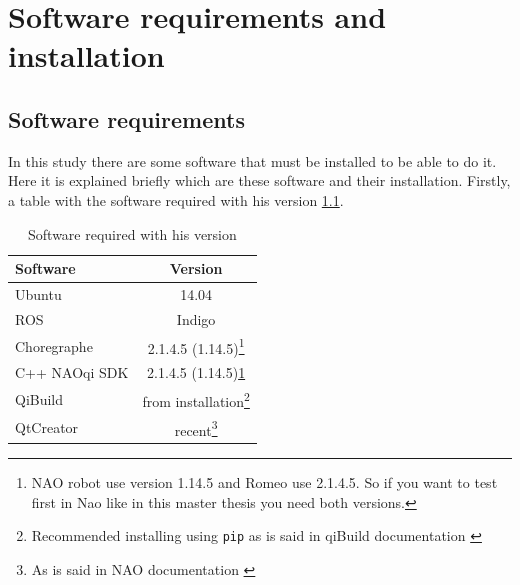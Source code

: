 \documentclass[12pt,a4paper,final,twoside,openright]{report}
\renewcommand{\thefigure}{\arabic{chapter}.\arabic{figure}}
\renewcommand{\thetable}{\arabic{chapter}.\arabic{table}}
\renewcommand{\theequation}{\arabic{chapter}.\arabic{equation}}
\renewcommand{\thefootnote}{\arabic{footnote}}
\begin{document}

\label{cha:references}

\appendix
\clearpage %
\addappheadtotoc
\appendixpage

\renewcommand{\thefigure}{\thechapter.\arabic{figure}}
\renewcommand{\thetable}{\thechapter.\arabic{table}}
\renewcommand{\theequation}{\thechapter.\arabic{equation}}
\renewcommand{\thefootnote}{\arabic{footnote}}

%
\chapter{Software requirements and installation}
\section{Software requirements}

In this study there are some software that must be installed to be able to do it. Here it is explained briefly which are these software and their installation. Firstly, a table with the software required with his version \ref{tab:soft_req}.

\begin{savenotes}
\begin{table}[h]
\begin{center}
\begin{tabular}{l|c|}
Software & Version\\ \hline
Ubuntu & 14.04\\
ROS & Indigo\\
Choregraphe & 2.1.4.5 (1.14.5)\footnote{\label{fn:nao_version}NAO robot use version 1.14.5 and Romeo use 2.1.4.5. So if you want to test first in Nao like in this master thesis you need both versions.}\\
C++ NAOqi SDK & 2.1.4.5 (1.14.5)\cref{fn:nao_version}\\
QiBuild & from installation\footnote{Recommended installing using \texttt{pip} as is said in qiBuild documentation \cite{AldebaranQiBuild}}\\
QtCreator & recent\footnote{As is said in NAO documentation \cite{AldebaranC++SDK}}\\
\end{tabular}
\caption{Software required with his version\label{tab:soft_req}}
\end{center}
\end{table}
\end{savenotes}
\end{document}
